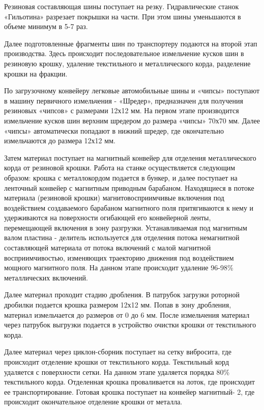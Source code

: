 Резиновая составляющая шины поступает на резку. Гидравлические станок «Гильотина» разрезает покрышки на части. При этом шины уменьшаются в объеме минимум в 5-7 раз.

Далее подготовленные фрагменты шин по транспортеру подаются на второй этап производства.
Здесь происходит последовательное измельчение кусков шин в резиновую крошку, удаление текстильного и металлического корда, разделение крошки на фракции.

По загрузочному конвейеру легковые автомобильные шины и «чипсы» поступают в машину первичного измельчения - «Шредер», предназначен для получения резиновых «чипсов» с размерами 12х12 мм. На первом этапе производится измельчение кусков шин верхним шредером до размера «чипсы» 70х70 мм. Далее «чипсы» автоматически попадают в нижний шредер, где окончательно измельчаются до размера 12х12 мм.

Затем материал поступает на магнитный конвейер для отделения металлического корда от резиновой крошки. Работа на станке осуществляется следующим образом: крошка с металлокордом подается в бункер, и далее поступает на ленточный конвейер с магнитным приводным барабаном. Находящиеся в потоке материала (резиновой крошки) магнитовосприимчивые включения под воздействием создаваемого барабаном магнитного поля притягиваются к нему и удерживаются на поверхности огибающей его конвейерной ленты, перемещающей включения в зону разгрузки. Устанавливаемая под магнитным валом пластина - делитель используется для отделения потока немагнитной составляющей материала от потока включений с малой магнитной восприимчивостью, изменяющих траекторию движения под воздействием мощного магнитного поля. На данном этапе происходит удаление 96-98\% металлических включений.

Далее материал проходит стадию дробления.
В патрубок загрузки роторной дробилки подается крошка размером 12х12 мм. Попав в зону дробления, материал измельчается до размеров от 0 до 6 мм.
После измельчения материал через патрубок выгрузки подается в устройство очистки крошки от текстильного корда.

Далее материал через циклон-сборник поступает на сетку вибросита, где происходит отделение крошки от текстильного корда. Текстильный корд удаляется с поверхности сетки. На данном этапе удаляется порядка 80\% текстильного корда. Отделенная крошка проваливается на лоток, где происходит ее транспортирование. Готовая крошка поступает на конвейер магнитный- 2, где происходит окончательное отделение крошки от металла.

